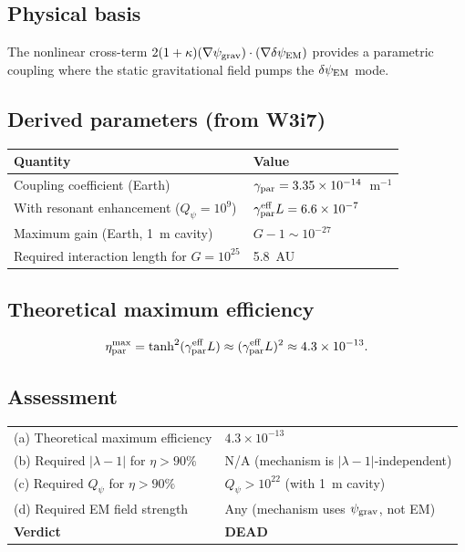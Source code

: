 \documentclass[11pt]{article}
\newcommand{\ee}[1]{\times 10^{#1}}
\newcommand{\psigrav}{\psi_{\rm grav}}
\newcommand{\dpsiEM}{\delta\psi_{\rm EM}}
\newcommand{\lambdaone}{|\lambda{-}1|}
\newcommand{\Qpsi}{Q_\psi}
\begin{document}
\subsection{Physical basis}

The nonlinear cross-term
$2(1+\kappa)(\nabla\psigrav)\cdot(\nabla\dpsiEM)$ provides a parametric
coupling where the static gravitational field pumps the $\dpsiEM$ mode.

\subsection{Derived parameters (from W3i7)}

\begin{center}
\begin{tabular}{ll}
\toprule
Quantity & Value \\
\midrule
Coupling coefficient (Earth) & $\gamma_{\rm par} = 3.35\ee{-14}$~m$^{-1}$ \\
With resonant enhancement ($\Qpsi = 10^9$) & $\gamma_{\rm par}^{\rm eff}L
  = 6.6\ee{-7}$ \\
Maximum gain (Earth, 1~m cavity) & $G - 1 \sim 10^{-27}$ \\
Required interaction length for $G = 10^{25}$ & 5.8~AU \\
\bottomrule
\end{tabular}
\end{center}

\subsection{Theoretical maximum efficiency}

\begin{equation}
\eta_{\rm par}^{\rm max}
= \tanh^2(\gamma_{\rm par}^{\rm eff}L)
\approx (\gamma_{\rm par}^{\rm eff}L)^2
\approx 4.3\ee{-13}.
\end{equation}

\subsection{Assessment}

\begin{center}
\begin{tabular}{ll}
\toprule
(a) Theoretical maximum efficiency & $4.3\ee{-13}$ \\
(b) Required $\lambdaone$ for $\eta > 90\%$ & N/A (mechanism is $\lambdaone$-independent) \\
(c) Required $\Qpsi$ for $\eta > 90\%$ & $\Qpsi > 10^{22}$ (with 1~m cavity) \\
(d) Required EM field strength & Any (mechanism uses $\psigrav$, not EM) \\
\midrule
\textbf{Verdict} & \textbf{DEAD} \\
\bottomrule
\end{tabular}
\end{center}
\end{document}
